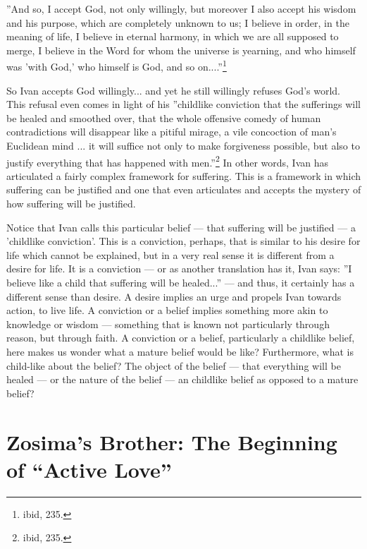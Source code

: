 ''And so, I accept God, not only willingly, but moreover I also accept his wisdom and his purpose, which are completely unknown to us; I believe in order, in the meaning of life, I believe in eternal harmony, in which we are all supposed to merge, I believe in the Word for whom the universe is yearning, and who himself was 'with God,' who himself is God, and so on....''\footnote{ibid, 235.} 

So Ivan accepts God willingly... and yet he still willingly refuses God's world. This refusal even comes in light of his ''childlike conviction that the sufferings will be healed and smoothed over, that the whole offensive comedy of human contradictions will disappear like a pitiful mirage, a vile concoction of man's Euclidean mind ... it will suffice not only to make forgiveness possible, but also to justify everything that has happened with men.''\footnote{ibid, 235.} In other words, Ivan has articulated a fairly complex framework for suffering. This is a framework in which suffering can be justified and one that even articulates and accepts the mystery of how suffering will be justified.

Notice that Ivan calls this particular belief --- that suffering will be justified --- a 'childlike conviction'. This is a conviction, perhaps, that is similar to his desire for life which cannot be explained, but in a very real sense it is different from a desire for life. It is a conviction --- or as another translation has it, Ivan says: ''I believe like a child that suffering will be healed...'' --- and thus, it certainly has a different sense than desire. A desire implies an urge and propels Ivan towards action, to live life. A conviction or a belief implies something more akin to knowledge or wisdom --- something that is known not particularly through reason, but through faith. A conviction or a belief, particularly a childlike belief, here makes us wonder what a mature belief would be like? Furthermore, what is child-like about the belief? The object of the belief --- that everything will be healed --- or the nature of the belief --- an childlike belief as opposed to a mature belief?
	

	\section{Zosima's Brother: The Beginning of ``Active Love''}
  
